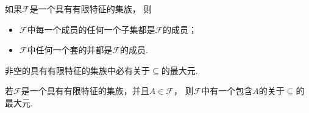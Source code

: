 \begin{lemma}
如果\(\mathscr{F}\)是一个具有有限特征的集族，
则\begin{itemize}
	\item \(\mathscr{F}\)中每一个成员的任何一个子集都是\(\mathscr{F}\)的成员；
	\item \(\mathscr{F}\)中任何一个套的并都是\(\mathscr{F}\)的成员.
\end{itemize}
\end{lemma}

\begin{theorem}[图基引理]
非空的具有有限特征的集族中必有关于\(\subseteq\)的最大元.
\end{theorem}

\begin{corollary}
若\(\mathscr{F}\)是一个具有有限特征的集族，并且\(A \in \mathscr{F}\)，
则\(\mathscr{F}\)中有一个包含\(A\)的关于\(\subseteq\)的最大元.
\end{corollary}
